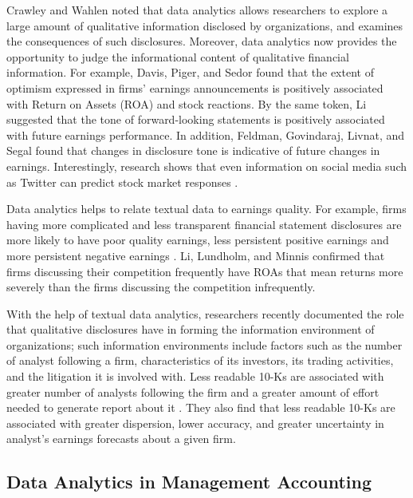 \documentclass[
]{book}
\begin{document}
Crawley and Wahlen \citeyearpar{crawley_analytics_2014} noted that data analytics allows researchers to explore a large amount of qualitative information disclosed by organizations, and examines the consequences of such disclosures. Moreover, data analytics now provides the opportunity to judge the informational content of qualitative financial information. For example, Davis, Piger, and Sedor \citeyearpar{davis_beyond_2012} found that the extent of optimism expressed in firms' earnings announcements is positively associated with Return on Assets (ROA) and stock reactions. By the same token, Li \citeyearpar{li_information_2010} suggested that the tone of forward-looking statements is positively associated with future earnings performance. In addition, Feldman, Govindaraj, Livnat, and Segal \citeyearpar{feldman_managements_2010} found that changes in disclosure tone is indicative of future changes in earnings. Interestingly, research shows that even information on social media such as Twitter can predict stock market responses \citep{bollen_twitter_2011}.

Data analytics helps to relate textual data to earnings quality. For example, firms having more complicated and less transparent financial statement disclosures are more likely to have poor quality earnings, less persistent positive earnings and more persistent negative earnings \citep{li_annual_2008} . Li, Lundholm, and Minnis \citeyearpar{li_measure_2013} confirmed that firms discussing their competition frequently have ROAs that mean returns more severely than the firms discussing the competition infrequently.

With the help of textual data analytics, researchers recently documented the role that qualitative disclosures have in forming the information environment of organizations; such information environments include factors such as the number of analyst following a firm, characteristics of its investors, its trading activities, and the litigation it is involved with. Less readable 10-Ks are associated with greater number of analysts following the firm and a greater amount of effort needed to generate report about it \citep{lehavy_effect_2011}. They also find that less readable 10-Ks are associated with greater dispersion, lower accuracy, and greater uncertainty in analyst's earnings forecasts about a given firm.

\hypertarget{data-analytics-in-management-accounting}{%
\subsection{Data Analytics in Management Accounting}\label{data-analytics-in-management-accounting}}
\end{document}
